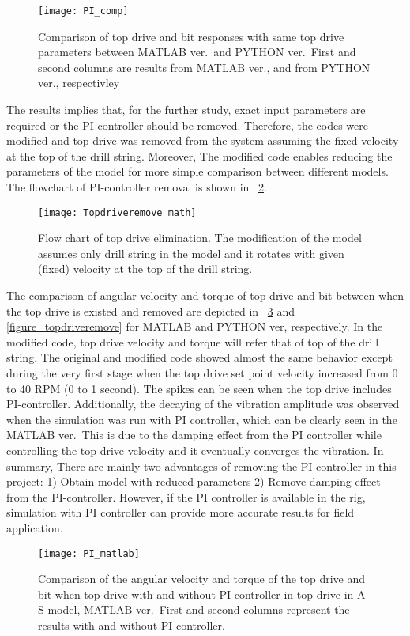 \begin{figure}
  \centering
  \texttt{[image: PI\_comp]}
  \caption[Comparison of drillstring response to same top drive parameters]{Comparison of top drive and bit responses with same top drive parameters between MATLAB ver.\ and PYTHON ver.\ First and second columns are results from MATLAB ver., and from PYTHON ver., respectivley}\label{figure_topdrive_sensitivity}
\end{figure}

The results implies that, for the further study, exact input parameters are required or the PI-controller should be removed. Therefore, the codes were modified and top drive was removed from the system assuming the fixed velocity at the top of the drill string. Moreover, The modified code enables reducing the parameters of the model for more simple comparison between different models. The flowchart of PI-controller removal is shown in \figurename~\ref{figure_Topdriveremove_math}. 

\begin{figure}
  \centering
  \texttt{[image: Topdriveremove\_math]}
  \caption[flow chart of top drive elimination]{Flow chart of top drive elimination. The modification of the model assumes only drill string in the model and it rotates with given (fixed) velocity at the top of the drill string.}\label{figure_Topdriveremove_math}
\end{figure}

The comparison of angular velocity and torque of top drive and bit between when the top drive is existed and removed are depicted in \figurename~\ref{figure_topdriveremove_MATLAB} and \ref{figure_topdriveremove} for MATLAB and PYTHON ver, respectively. In the modified code, top drive velocity and torque will refer that of top of the drill string. The original and modified code showed almost the same behavior except during the very first stage when the top drive set point velocity increased from 0 to 40 RPM (0 to 1 second). The spikes can be seen when the top drive includes PI-controller. Additionally, the decaying of the vibration amplitude was observed when the simulation was run with PI controller, which can be clearly seen in the MATLAB ver.\ This is due to the damping effect from the PI controller while controlling the top drive velocity and it eventually converges the vibration. In summary, There are mainly two advantages of removing the PI controller in this project: 1) Obtain model with reduced parameters 2) Remove damping effect from the PI-controller. However, if the PI controller is available in the rig, simulation with PI controller can provide more accurate results for field application.
\begin{figure}
  \centering
  \texttt{[image: PI\_matlab]}
  \caption[comparison between with and without top drive: Matlab ver]{Comparison of the angular velocity and torque of the top drive and bit when top drive with and without PI controller in top drive in A-S model, MATLAB ver.\ First and second columns represent the results with and without PI controller.}\label{figure_topdriveremove_MATLAB}
\end{figure}

